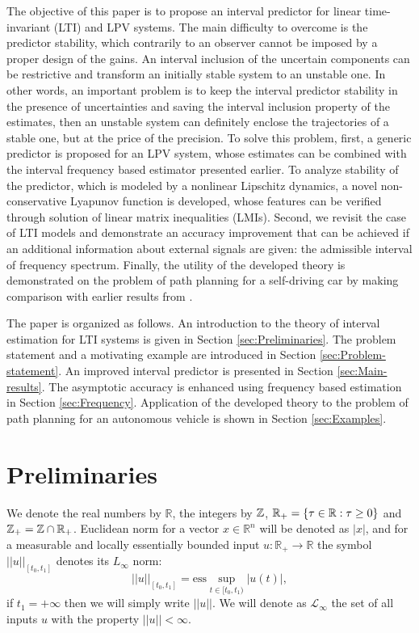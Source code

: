 \documentclass[twocolumn,english]{IEEEtran}
\theoremstyle{plain}
\theoremstyle{definition}
\theoremstyle{plain}
\theoremstyle{plain}
\theoremstyle{remark}
\begin{document}
The objective of this paper is to propose an interval predictor for linear time-invariant (LTI) and LPV systems. The main difficulty to overcome is the predictor stability, which contrarily to an observer cannot be imposed by a proper design of the gains. An interval inclusion of the uncertain components can be restrictive and transform an initially stable system to an unstable one. In other words, an important problem is to keep the interval predictor stability in the presence of uncertainties and saving the interval inclusion property of the estimates, then an unstable system can definitely enclose the trajectories of a stable one, but at the price of the precision. To solve this problem, first, a generic predictor is proposed for an LPV system, whose estimates can be combined with the interval frequency based estimator presented earlier. To analyze stability of the predictor, which is modeled by a nonlinear Lipschitz dynamics, a novel non-conservative Lyapunov function is developed, whose features can be verified through solution of linear matrix inequalities (LMIs). Second, we revisit the case of LTI models and demonstrate an accuracy improvement that can be achieved if an additional information about external signals are given: the admissible interval of frequency spectrum. Finally, the utility of the developed theory is demonstrated on the problem of path planning for a self-driving car by making comparison with earlier results from \cite{Leurent2018}.

The paper is organized as follows. An introduction to the theory of interval estimation for LTI systems is given in Section \ref{sec:Preliminaries}. The problem statement and a motivating example are introduced in Section \ref{sec:Problem-statement}. An improved interval predictor is presented in Section \ref{sec:Main-results}. The asymptotic accuracy is enhanced using frequency based estimation in Section \ref{sec:Frequency}. Application of the developed theory to the problem of path planning for an autonomous vehicle is shown in Section \ref{sec:Examples}.

\section{\label{sec:Preliminaries} Preliminaries}

We denote the real numbers  by $\mathbb{R}$, the integers by $\mathbb{Z}$, $\mathbb{R}_{+}=\{\tau\in\mathbb{R}:\tau\ge0\}$ and $\mathbb{Z}_{+}=\mathbb{Z}\cap\mathbb{R}_{+}$. Euclidean norm for a vector $x\in\mathbb{R}^{n}$ will be denoted as $|x|$, and for a measurable and locally essentially bounded input $u:\mathbb{R}_{+}\to\mathbb{R}$ the symbol $||u||_{[t_{0},t_{1}]}$ denotes its $L_{\infty}$ norm:
\[
||u||_{[t_{0},t_{1}]}=\text{ess}\sup_{t\in[t_{0},t_{1})}|u(t)|,
\]
if $t_{1}=+\infty$ then we will simply write $||u||$. We will denote as $\mathcal{L}_{\infty}$ the set of all inputs $u$ with the property $||u||<\infty$. 
\end{document}
